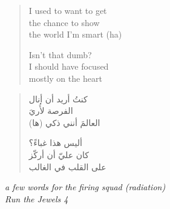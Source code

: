 \clearpage\thispagestyle{empty}\vspace*{\fill}

\begin{otherlanguage}{english}
\begin{verse}
I used to want to get \\
the chance to show \\
the world I'm smart (ha)

Isn't that dumb? \\
I should have focused \\
mostly on the heart
\end{verse}
\end{otherlanguage}
\begin{verse}\small
كنتُ أريد أن أنال \\
الفرصة لأُريَ \\
العالمَ أنني ذكي (ها)

أليس هذا غباءً؟ \\
كان عليّ أن أركّز \\
على القلب في الغالب
\end{verse}
\begin{otherlanguage}{english}
\begin{flushright}\small\itshape
a few words for the firing squad (radiation) \\
Run the Jewels 4
\end{flushright}
\end{otherlanguage}

\vspace*{\fill}\clearpage
